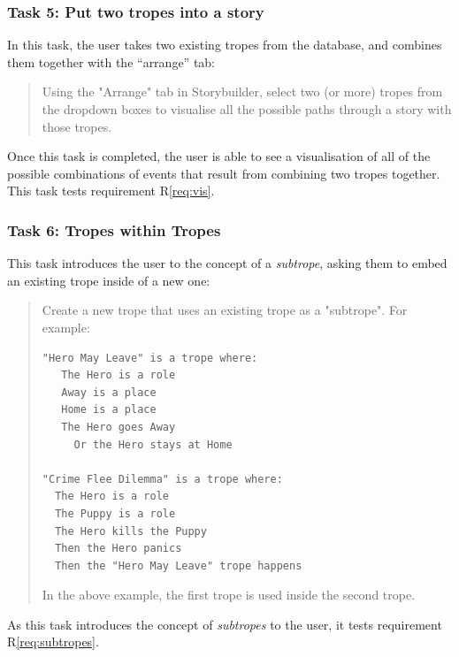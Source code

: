 \documentclass[11pt]{report}
\begin{document}
\subsubsection*{Task 5: Put two tropes into a story}
\label{sec:orga5afeae}

In this task, the user takes two existing tropes from the database, and combines
them together with the ``arrange'' tab:

\begin{framed}
\begin{quote}
Using the "Arrange" tab in Storybuilder, select two (or more) tropes from the dropdown boxes to visualise all the possible paths through a story with those tropes.
\end{quote}
\end{framed}

Once this task is completed, the user is able to see a visualisation of all of the possible
combinations of events that result from combining two tropes together. This task
tests requirement R\ref{req:vis}.

\subsubsection*{Task 6: Tropes within Tropes}
\label{sec:orga5bc382}

This task introduces the user to the concept of a \emph{subtrope}, asking them
to embed an existing trope inside of a new one:

\begin{framed}
\begin{quote}
Create a new trope that uses an existing trope as a "subtrope". For example:

\begin{verbatim}
"Hero May Leave" is a trope where:
   The Hero is a role
   Away is a place
   Home is a place
   The Hero goes Away
     Or the Hero stays at Home

"Crime Flee Dilemma" is a trope where:
  The Hero is a role
  The Puppy is a role
  The Hero kills the Puppy
  Then the Hero panics
  Then the "Hero May Leave" trope happens
\end{verbatim}

In the above example, the first trope is used inside the second trope.
\end{quote}
\end{framed}

As this task introduces the concept of \emph{subtropes} to the user, it tests
requirement R\ref{req:subtropes}.
\end{document}
